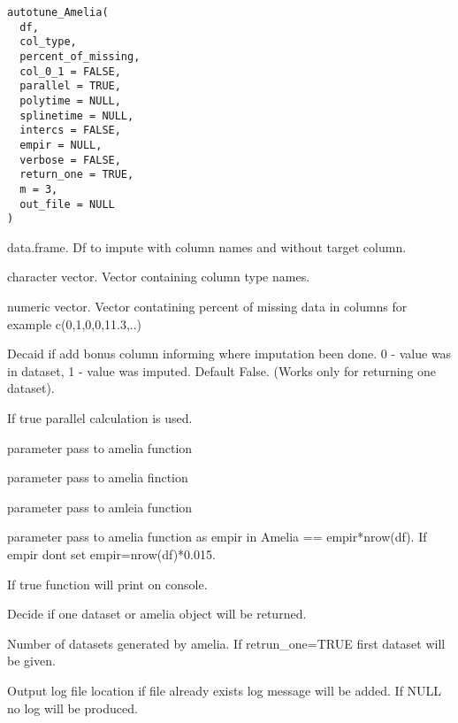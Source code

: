 \documentclass[letterpaper]{book}
\begin{document}
%
\begin{Usage}
\begin{verbatim}
autotune_Amelia(
  df,
  col_type,
  percent_of_missing,
  col_0_1 = FALSE,
  parallel = TRUE,
  polytime = NULL,
  splinetime = NULL,
  intercs = FALSE,
  empir = NULL,
  verbose = FALSE,
  return_one = TRUE,
  m = 3,
  out_file = NULL
)
\end{verbatim}
\end{Usage}
%
\begin{Arguments}
\begin{ldescription}
\item[\code{df}] data.frame. Df to impute with column names and without target column.

\item[\code{col\_type}] character vector. Vector containing column type names.

\item[\code{percent\_of\_missing}] numeric vector. Vector contatining percent of missing data in columns for example  c(0,1,0,0,11.3,..)

\item[\code{col\_0\_1}] Decaid if add bonus column informing where imputation been done. 0 - value was in dataset, 1 - value was imputed. Default False. (Works only for returning one dataset).

\item[\code{parallel}] If true parallel calculation is used.

\item[\code{polytime}] parameter pass to amelia function

\item[\code{splinetime}] parameter pass to amelia finction

\item[\code{intercs}] parameter pass to amleia function

\item[\code{empir}] parameter pass to amelia function as empir in Amelia == empir*nrow(df). If empir dont set empir=nrow(df)*0.015.

\item[\code{verbose}] If true function will print on console.

\item[\code{return\_one}] Decide if one dataset or amelia object will be returned.

\item[\code{m}] Number of datasets generated by amelia. If retrun\_one=TRUE first dataset will be given.

\item[\code{out\_file}] Output log file location if file already exists log message will be added. If NULL no log will be produced.
\end{ldescription}
\end{Arguments}
\end{document}
